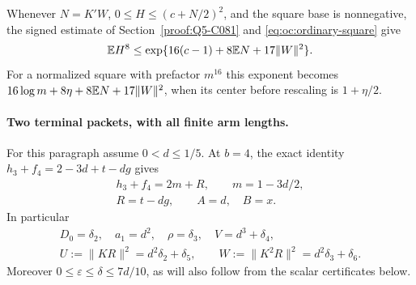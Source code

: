 Whenever \(N=K'W\), \(0\le H\le(c+N/2)^2\), and the square
base is nonnegative, the signed estimate of
Section~\ref{proof:Q5-C081} and \eqref{eq:oc:ordinary-square} give
\begin{equation}\label{eq:unit-ordinary:three-signed}
 \mathbb E H^8\le\exp\{16(c-1)+8\mathbb E N+17\|W\|^2\}.
\end{equation}
For a normalized square with prefactor \(m^{16}\) this exponent
becomes \(16\log m+8\eta+8\mathbb E N+17\|W\|^2\), when its center
before rescaling is \(1+\eta/2\).

\paragraph{Two terminal packets, with all finite arm lengths.}
For this paragraph assume \(0<d\le1/5\). At \(b=4\), the exact
identity \(h_3+f_4=2-3d+t-dg\) gives
\begin{equation}\label{eq:unit-ordinary:three-four-sum}
 \begin{gathered}
 h_3+f_4=2m+R,\qquad m=1-3d/2,\\
 R=t-dg,\qquad A=d,\quad B=x.
 \end{gathered}
\end{equation}
In particular
\begin{equation}\label{eq:unit-ordinary:three-four-data}
 \begin{gathered}
 D_0=\delta_2,\quad a_1=d^2,\quad\rho=\delta_3,
 \quad V=d^3+\delta_4,\\
 U:=\|KR\|^2=d^2\delta_2+\delta_5,\qquad
 W:=\|K^2R\|^2=d^2\delta_3+\delta_6.
 \end{gathered}
\end{equation}
Moreover \(0\le\varepsilon\le\delta\le7d/10\), as will also
follow from the scalar certificates below.

